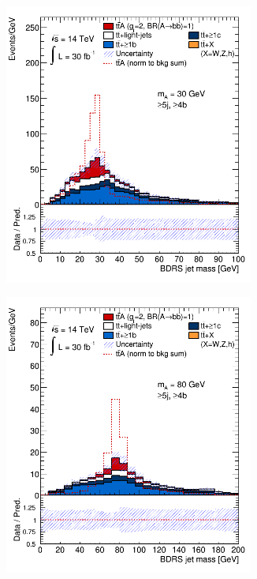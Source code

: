 \begin{figure}[p!]
\begin{subfigure}{0.5\textwidth}
  \caption{}
  \label{}
\end{subfigure}
\begin{subfigure}{0.5\textwidth}
  \centering
  \includegraphics[width=0.9\textwidth]{figures/ttA/VD_2_30.png}
  \caption{}
  \label{}
\end{subfigure}
\begin{subfigure}{0.5\textwidth}
  \centering
  \includegraphics[width=0.9\textwidth]{figures/ttA/VD_2.png}

\end{subfigure}
\end{figure}
